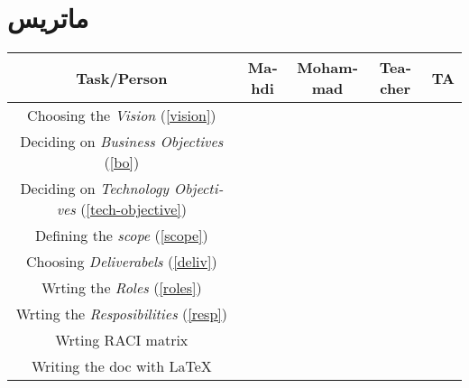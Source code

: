 \chapter{ماتریس }
\begin{table}[H]
\begin{latin}
\begin{adjustbox}{width=\textwidth}
\begin{tabular}{|c|c|c|c|c|}
\hline
Task/Person & Mahdi & Mohammad & Teacher & TA \\
\hline
\hline

Choosing the \textit{Vision} (\ref{vision}) &&&& \\
\hline

Deciding on \textit{Business Objectives} (\ref{bo}) &&&& \\
\hline

Deciding on \textit{Technology Objectives} (\ref{tech-objective}) &&&& \\
\hline

Defining the \textit{scope} (\ref{scope}) &&&& \\
\hline

Choosing \textit{Deliverabels} (\ref{deliv}) &&&& \\
\hline

Wrting the \textit{Roles} (\ref{roles}) &&&& \\
\hline

Wrting the \textit{Resposibilities} (\ref{resp}) &&&& \\
\hline


Wrting RACI matrix &&&& \\
\hline
Writing the doc with \LaTeX &&&& \\
\hline
\end{tabular}
\end{adjustbox}
\end{latin}
\end{table}
